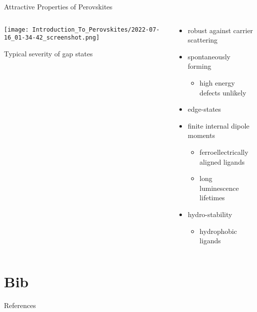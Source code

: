 \documentclass[10pt, aspectratio=169, presentation]{beamer}
\begin{document}
\begin{frame}[label={sec:org63d11ca}]{Attractive Properties of Perovskites}
\begin{columns}
\begin{column}{0.5\columnwidth}
\begin{center}
\texttt{[image: Introduction\_To\_Perovskites/2022-07-16\_01-34-42\_screenshot.png]}
\end{center}
Typical severity of gap states
\autocite{mannodi-kanakkithodi-2020-defec-energ}
\end{column}
\begin{column}{0.5\columnwidth}
\begin{itemize}
\item robust against carrier scattering
\autocite{yan-2016-defec-physic}
\item spontaneously forming
\begin{itemize}
\item high energy defects unlikely
\end{itemize}
\item edge-states
\item finite internal dipole moments
\autocite{hong-2021-layer-edge}
\begin{itemize}
\item ferroellectrically aligned ligands
\item long luminescence lifetimes
\end{itemize}
\item hydro-stability
\autocite{fu-2021-two-dimen}
\begin{itemize}
\item hydrophobic ligands
\end{itemize}
\end{itemize}
\end{column}
\end{columns}
\end{frame}

\section{Bib}
\label{sec:orgcacb5ff}
\begin{frame}[label={sec:orge63e173}]{References}
\AtNextBibliography{\tiny}
\printbibliography
\end{frame}
\end{document}
